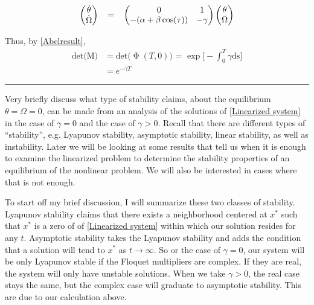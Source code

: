 \documentclass[12pt]{article}
\newcommand{\jump}{\vspace{5mm}}
\begin{document}
\begin{enumerate}[]
\begin{solution}
            \begin{align}
                \begin{pmatrix}
                    \dot{\theta} \\
                    \dot{\Omega}
                \end{pmatrix}
                \hspace{3mm}
                = 
                \hspace{3mm}
                \begin{pmatrix}
                    0    &1 \\
                    -(\alpha + \beta\cos(\tau)) &-\gamma
                \end{pmatrix}
                \begin{pmatrix}
                    \theta  \\
                    \Omega
                \end{pmatrix}
                \label{damplinearsystem}
            \end{align}

            Thus, by \ref{Abelresult}, 
            \begin{align}
                \text{det(M)} &= \text{det($\upPhi(T,0)$) = } \exp\Bigg[-\int_0^T \gamma \text{ds}\Bigg] \nonumber\\
                &=e^{-\gamma T}
            \end{align}
        \end{solution}

        \jump
        \hrule
        \jump

     Very briefly discuss what type of stability claims, about the equilibrium $\theta = \Omega = 0$, can be made from an analysis of the solutions of \ref{Linearized system} in the case of $\gamma = 0$ and the case of $\gamma > 0$. Recall that there are different types of “stability”, e.g. Lyapunov stability, asymptotic stability, linear stability, as well as instability. Later we will be looking at some results that tell us when it is enough to examine the linearized problem to determine the stability properties of an equilibrium of the nonlinear problem. We will also be interested in cases where that is not enough.

     \jump
     \begin{solution}
         To start off my brief discussion, I will summarize these two classes of stability. Lyapunov stability claims that there exists a neighborhood centered at $x^*$ such that $x^*$ is a zero of of \ref{Linearized system} within which our solution resides for any $t$. Asymptotic stability takes the Lyapunov stability and adds the condition that a solution will tend to $x^*$ as $t \rightarrow \infty$. So or the case of $\gamma = 0$, our system will be only Lyapunov stable if the Floquet multipliers are complex. If they are real, the system will only have unstable solutions. When we take $\gamma > 0$, the real case stays the same, but the complex case will graduate to asymptotic stability. This are due to our calculation above. 
     \end{solution}


\end{enumerate}
\end{document}
